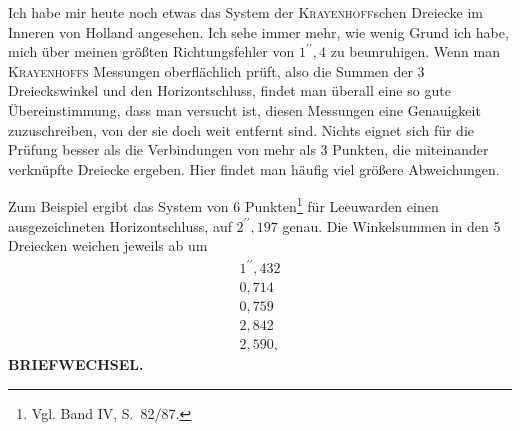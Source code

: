 Ich habe mir heute noch etwas das System der \textsc{Krayenhoff}schen
Dreiecke im Inneren von Holland angesehen. Ich sehe immer mehr, wie wenig
Grund ich habe, mich über meinen größten Richtungsfehler von $1^{\prime\prime}{,}4$
zu beunruhigen. Wenn man \textsc{Krayenhoffs} Messungen oberflächlich prüft,
also die Summen der 3 Dreieckswinkel und den Horizontschluss, findet man
überall eine so gute Übereinstimmung, dass man versucht ist, diesen Messungen
eine Genauigkeit zuzuschreiben, von der sie doch  weit
entfernt sind. Nichts eignet sich für die Prüfung besser als die Verbindungen
von mehr als 3 Punkten, die miteinander verknüpfte Dreiecke ergeben. Hier
findet man häufig viel größere Abweichungen.
\begin{center}
\end{center}
\begingroup
\makeatletter
\renewcommand{\@makefnmark}{\hbox{\normalfont[\textsuperscript{*})]}}
\renewcommand{\@makefntext}[1]{\parindent1em\noindent\hbox to1.8em{\hss[\textsuperscript{*})\ }#1]}
\makeatother
\noindent Zum Beispiel ergibt das System von 6 Punkten\footnote{Vgl. Band IV,
S.\ 82/87.} für Leeuwarden einen ausgezeichneten Horizontschluss, auf
$2^{\prime\prime}{,}197$ genau. Die Winkelsummen in den 5 Dreiecken weichen
jeweils ab um
\[
\begin{array}{r}
1^{\prime\prime}{,}432\\
0{,}714\\
0{,}759\\
2{,}842\\
2{,}590,
\end{array}
\]
\endgroup
\makeatletter
\def\ps@gaussIXfortyone{\def\@oddhead{}\def\@evenhead{}\def\@oddfoot{\small IX.\hfil41}\let\@evenfoot\@oddfoot}
\makeatother
\thispagestyle{gaussIXfortyone}
\clearpage
{}\hfill\textbf{BRIEFWECHSEL.}\par\medskip
